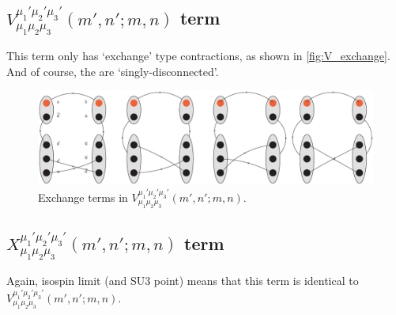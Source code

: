 \documentclass[%
 preprint,
nofootinbib,
 amsmath,amssymb,
 aps,
]{revtex4-2}
\begin{document}
\subsection{$V^{\mu_1'\mu_2'\mu_3'}_{\mu_1\mu_2\mu_3}(m',n';m,n)$ term}
This term only has `exchange' type contractions, as shown in \autoref{fig:V_exchange}.  And of course, the are `singly-disconnected'.
\begin{figure}
\includegraphics[width=\textwidth]{V_exchange.eps}
\caption{Exchange terms in $V^{\mu_1'\mu_2'\mu_3'}_{\mu_1\mu_2\mu_3}(m',n';m,n)$. \label{fig:V_exchange}}
\end{figure}

\subsection{$X^{\mu_1'\mu_2'\mu_3'}_{\mu_1\mu_2\mu_3}(m',n';m,n)$ term}
Again, isospin limit (and SU3 point) means that this term is identical to $V^{\mu_1'\mu_2'\mu_3'}_{\mu_1\mu_2\mu_3}(m',n';m,n)$.
\end{document}
